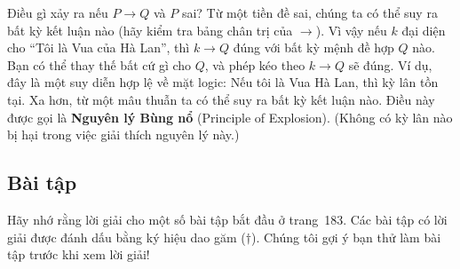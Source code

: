 \begin{infobox}
Điều gì xảy ra nếu $P \to Q$ và $P$ sai? Từ một tiền đề sai, chúng ta có thể suy ra bất kỳ kết luận nào (hãy kiểm tra bảng chân trị của $\to$). Vì vậy nếu $k$ đại diện cho ``Tôi là Vua của Hà Lan'', thì $k \to Q$ đúng với bất kỳ mệnh đề hợp $Q$ nào. Bạn có thể thay thế bất cứ gì cho $Q$, và phép kéo theo $k \to Q$ sẽ đúng. Ví dụ, đây là một suy diễn hợp lệ về mặt logic: Nếu tôi là Vua Hà Lan, thì kỳ lân tồn tại. Xa hơn, từ một mâu thuẫn ta có thể suy ra bất kỳ kết luận nào. Điều này được gọi là \textbf{Nguyên lý Bùng nổ} (Principle of Explosion). (Không có kỳ lân nào bị hại trong việc giải thích nguyên lý này.)
\end{infobox}

\subsection*{Bài tập}

\begin{notebox}
Hãy nhớ rằng lời giải cho một số bài tập bắt đầu ở trang~183. Các bài tập có lời giải được đánh dấu bằng ký hiệu dao găm ($\dagger$). Chúng tôi gợi ý bạn thử làm bài tập trước khi xem lời giải!
\end{notebox}

